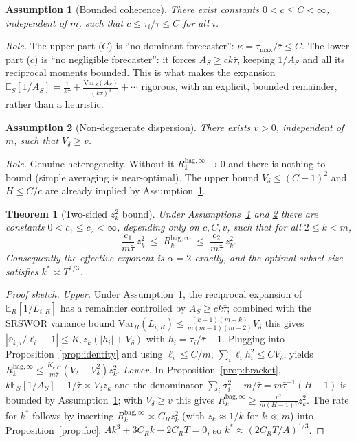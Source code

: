 \documentclass[11pt]{article}
\newcommand{\E}{\mathbb{E}}
\newcommand{\Var}{\mathrm{Var}}
\newcommand{\Rk}{R_k^{\mathrm{bag},\infty}}
\newtheorem{assumption}{Assumption}
\newtheorem{theorem}{Theorem}
\begin{document}
\begin{assumption}[Bounded coherence]\label{ass:A}
There exist constants $0<c\le C<\infty$, independent of $m$, such that
$c\le\tau_i/\bar\tau\le C$ for all $i$.
\end{assumption}
\noindent\emph{Role.} The upper part ($C$) is ``no dominant forecaster'':
$\kappa=\tau_{\max}/\bar\tau\le C$. The lower part ($c$) is ``no negligible
forecaster'': it forces $A_S\ge ck\bar\tau$, keeping $1/A_S$ and all its reciprocal
moments bounded. This is what makes the expansion
$\E_S[1/A_S]=\frac1{k\bar\tau}+\frac{\Var_S(A_S)}{(k\bar\tau)^3}+\cdots$ rigorous, with
an explicit, bounded remainder, rather than a heuristic.

\begin{assumption}[Non-degenerate dispersion]\label{ass:B}
There exists $v>0$, independent of $m$, such that $V_\delta\ge v$.
\end{assumption}
\noindent\emph{Role.} Genuine heterogeneity. Without it $\Rk\to0$ and there is nothing to
bound (simple averaging is near-optimal). The upper bound $V_\delta\le(C-1)^2$ and
$H\le C/c$ are already implied by Assumption~\ref{ass:A}.

\begin{theorem}[Two-sided $z_k^2$ bound]\label{thm:rate}
Under Assumptions~\ref{ass:A} and \ref{ass:B} there are constants $0<c_1\le c_2<\infty$,
depending only on $c,C,v$, such that for all $2\le k<m$,
\[
  \frac{c_1}{m\bar\tau}\,z_k^2\;\le\;\Rk\;\le\;\frac{c_2}{m\bar\tau}\,z_k^2 .
\]
Consequently the effective exponent is $\alpha=2$ exactly, and the optimal subset size
satisfies $k^\ast\asymp T^{1/3}$.
\end{theorem}
\begin{proof}[Proof sketch]
\emph{Upper.} Under Assumption~\ref{ass:A}, the reciprocal expansion of
$\E_R[1/L_{i,R}]$ has a remainder controlled by $A_S\ge ck\bar\tau$; combined with the
SRSWOR variance bound
$\Var_R(L_{i,R})\le\frac{(k-1)(m-k)}{m(m-1)(m-2)}V_\delta$ this gives
$|\bar v_{k,i}/\ell_i-1|\le K_{c}z_k(|h_i|+V_\delta)$ with $h_i=\tau_i/\bar\tau-1$.
Plugging into Proposition~\ref{prop:identity} and using $\ell_i\le C/m$,
$\sum_i\ell_ih_i^2\le CV_\delta$, yields
$\Rk\le\frac{K_{c,C}}{m\bar\tau}(V_\delta+V_\delta^2)z_k^2$. \emph{Lower.} In
Proposition~\ref{prop:bracket}, $k\E_S[1/A_S]-1/\bar\tau\asymp V_\delta z_k$ and the
denominator $\sum_i\sigma_i^2-m/\bar\tau=m\bar\tau^{-1}(H-1)$ is bounded by
Assumption~\ref{ass:A}; with $V_\delta\ge v$ this gives
$\Rk\ge\frac{v^2}{m(H-1)\bar\tau}z_k^2$. The rate for $k^\ast$ follows by inserting
$\Rk\asymp C_R z_k^2$ (with $z_k\approx1/k$ for $k\ll m$) into
Proposition~\ref{prop:foc}: $Ak^3+3C_Rk-2C_RT=0$, so $k^\ast\approx(2C_RT/A)^{1/3}$.
\end{proof}
\end{document}
